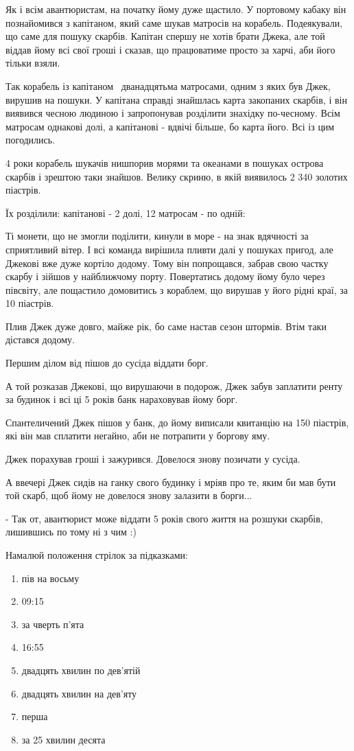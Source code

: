 Як і всім авантюристам, на початку йому дуже щастило.
У портовому кабаку він познайомився з капітаном, який саме шукав
матросів на корабель. Подеякували, що саме для пошуку скарбів.
Капітан спершу не хотів брати Джека, але той віддав йому всі свої
гроші і сказав, що працюватиме просто за харчі, аби його тільки взяли.

Так корабель із капітаном  дванадцятьма матросами, одним з яких був Джек,
вирушив на пошуки. У капітана справді знайшлась карта закопаних скарбів,
і він виявився чесною людиною і запропонував розділити знахідку по-чесному.
Всім матросам однакові долі, а капітанові - вдвічі більше, бо карта його.
Всі із цим погодились.

4 роки корабель шукачів нишпорив морями та океанами в пошуках острова
скарбів і зрештою таки знайшов. Велику скриню, в якій виявилось
2 340 золотих піастрів.

Їх розділили: капітанові - 2 долі, 12 матросам - по одній:

Ті монети, що не змогли поділити, кинули в море - на знак вдячності
за сприятливий вітер. І всі команда вирішила пливти далі у пошуках пригод,
але Джекові вже дуже кортіло додому. Тому він попрощався, забрав свою
частку скарбу і зійшов у найближчому порту. Повертатись додому йому було
через півсвіту, але пощастило домовитись з кораблем, що вирушав у його
рідні краї, за 10 піастрів.

Плив Джек дуже довго, майже рік, бо саме настав сезон штормів.
Втім таки дістався додому.

Першим ділом від пішов до сусіда віддати борг.

А той розказав Джекові, що вирушаючи в подорож, Джек забув заплатити
ренту за будинок і всі ці 5 років банк нараховував йому борг.

Спантеличений Джек пішов у банк, до йому виписали квитанцію на 150 піастрів,
які він мав сплатити негайно, аби не потрапити у боргову яму.

Джек порахував гроші і зажурився. Довелося знову позичати у сусіда.

А ввечері Джек сидів на ганку свого будинку і мріяв про те,
яким би мав бути той скарб, щоб йому не довелося знову залазити в борги...

- Так от, авантюрист може віддати 5 років свого життя на розшуки скарбів,
лишившись по тому ні з чим :)


\problem
Намалюй положення стрілок за підказками:
\begin{enumerate}
    \item пів на восьму
    \item 09:15
    \item за чверть п’ята
    \item 16:55
    \item двадцять хвилин по дев’ятій
    \item двадцять хвилин на дев’яту
    \item перша
    \item за 25 хвилин десята
\end{enumerate}


